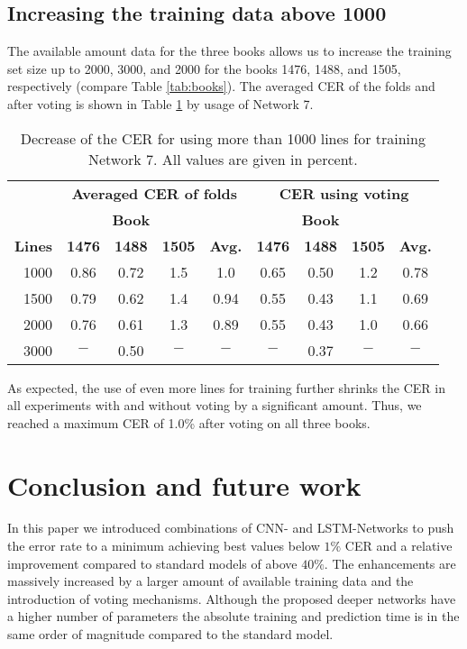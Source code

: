\documentclass{jlcl}
\begin{document}
\subsection{Increasing the training data above 1000}
The available amount data for the three books allows us to increase the training set size up to 2000, 3000, and 2000 for the books 1476, 1488, and 1505, respectively (compare Table \ref{tab:books}).
The averaged CER of the folds and after voting is shown in Table \ref{tab:huge_lines} by usage of Network 7.
\begin{table}[t]
    \centering
    \caption{Decrease of the CER for using more than 1000 lines for training Network 7. All values are given in percent.}
    \label{tab:huge_lines}
    \begin{tabular}{r|ccc|c|ccc|c|}
        \hline
              & \multicolumn{4}{c|}{\textbf{Averaged CER of folds}} & \multicolumn{4}{c|}{\textbf{CER using voting}} \\
              & \multicolumn{3}{c|}{\textbf{Book}} & & \multicolumn{3}{c|}{\textbf{Book}} & \\ 
        \textbf{Lines} & \textbf{1476} & \textbf{1488} & \textbf{1505} & \textbf{Avg.} & \textbf{1476} & \textbf{1488} & \textbf{1505} & \textbf{Avg.} \\
        \hline
        1000 & 0.86 & 0.72 & 1.5 & 1.0  & 0.65 & 0.50 & 1.2 & 0.78 \\
        1500 & 0.79 & 0.62 & 1.4 & 0.94 & 0.55 & 0.43 & 1.1 & 0.69 \\
        2000 & 0.76 & 0.61 & 1.3 & 0.89 & 0.55 & 0.43 & 1.0 & 0.66 \\
        3000 &  $-$ & 0.50 & $-$ &  $-$ &  $-$ & 0.37 & $-$ &  $-$ \\
        \hline
    \end{tabular}
\end{table}
As expected, the use of even more lines for training further shrinks the CER in all experiments with and without voting by a significant amount.
Thus, we reached a maximum CER of 1.0\% after voting on all three books.

\section{Conclusion and future work}
In this paper we introduced combinations of CNN- and LSTM-Networks to push the error rate to a minimum achieving best values below $1\%$ CER and a relative improvement compared to standard models of above $40\%$.
The enhancements are massively increased by a larger amount of available training data and the introduction of voting mechanisms.
Although the proposed deeper networks have a higher number of parameters the absolute training and prediction time is in the same order of magnitude compared to the standard model.
\end{document}
